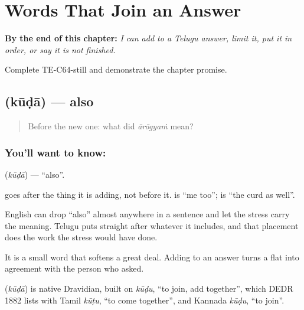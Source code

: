 
\chapter{Words That Join an Answer}
\label{ch:te-joining-words}

\begin{chapteropening}
\textbf{By the end of this chapter:} \emph{I can add to a Telugu answer, limit it, put it in order, or say it is not finished.}

Complete TE-C64-still and demonstrate the chapter promise.
\end{chapteropening}

\section[\texorpdfstring{\te{కూడా} (kūḍā)}{కూడా (kūḍā)}]{ (kūḍā) — also}

\label{lesson:TE-C64-also}



\begin{quote}
Before the new one: what did \emph{ārōgyaṁ} mean?
\end{quote}

\subsection*{You'll want to know: }
\textbf{} (\emph{kūḍā}) — \textquotedblleft{}also\textquotedblright{}.

 goes after the thing it is adding, not before it.   is \textquotedblleft{}me too\textquotedblright{};   is \textquotedblleft{}the curd as well\textquotedblright{}.

English can drop \textquotedblleft{}also\textquotedblright{} almost anywhere in a sentence and let the stress carry the meaning. Telugu puts  straight after whatever it includes, and that placement does the work the stress would have done.

It is a small word that softens a great deal. Adding  to an answer turns a flat  into agreement with the person who asked.

\begin{cousinweb}
\textbf{} (\emph{kūḍā}) is native Dravidian, built on \emph{kūḍu}, \textquotedblleft{}to join, add together\textquotedblright{}, which DEDR 1882 lists with Tamil \emph{kūṭu}, \textquotedblleft{}to come together\textquotedblright{}, and Kannada \emph{kūḍu}, \textquotedblleft{}to join\textquotedblright{}.
\end{cousinweb}

